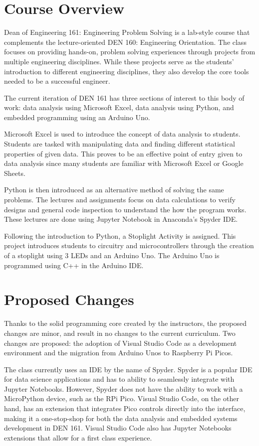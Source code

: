 \section{Course Overview}
Dean of Engineering 161: Engineering Problem Solving is a lab-style
course that complements the lecture-oriented DEN 160: Engineering
Orientation. The class focuses on providing hands-on, problem
solving experiences through projects from multiple engineering 
disciplines. While these projects serve as the students' introduction
to different engineering disciplines, they also develop the core 
tools needed to be a successful engineer. 

The current iteration of DEN 161 has three sections of interest to
this body of work: data analysis using Microsoft Excel, data analysis
using Python, and embedded programming using an Arduino Uno.

Microsoft Excel is used to introduce the concept of data analysis
to students. Students are tasked with manipulating data and 
finding different statistical properties of given data. 
This proves to be an effective point of entry given to data
analysis since many students are familiar with Microsoft Excel or 
Google Sheets.

Python is then introduced as an alternative method of solving the same
problems. The lectures and assignments focus on data calculations to 
verify designs and general code inspection to understand the 
how the program works. These lectures are done using Jupyter
Notebook in Anaconda's Spyder IDE. 

Following the introduction to Python, a Stoplight Activity is assigned. 
This project introduces students to circuitry and microcontrollers 
through the creation of a stoplight using 3 LEDs and an Arduino Uno.
The Arduino Uno is programmed using C++ in the Arduino IDE.

\section{Proposed Changes}
Thanks to the solid programming core created by the instructors,
the proposed changes are minor, and result in no changes to the
current curriculum. Two changes are proposed: the adoption of Visual 
Studio Code as a development environment and the migration from 
Arduino Unos to Raspberry Pi Picos. 

The class currently uses an IDE by the name of Spyder. Spyder is a
popular IDE for data science applications and has to ability to 
seamlessly integrate with Jupyter Notebooks. However, Spyder does
not have the ability to work with a MicroPython device, such as the
RPi Pico. Visual Studio Code, on the other hand, has an extension 
that integrates Pico controls directly into the interface, 
making it a one-stop-shop for both the data analysis and embedded 
systems development in DEN 161. Visual Studio Code also has 
Jupyter Notebooks extensions that allow for a first class experience.

